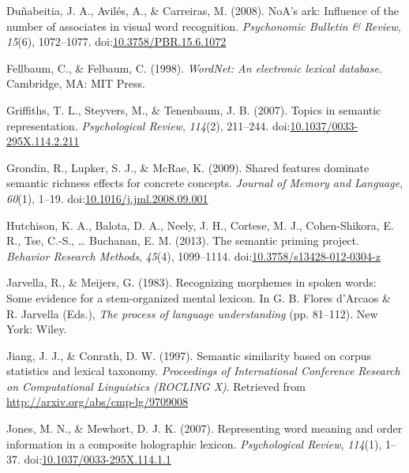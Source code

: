 \documentclass[english,,man]{apa6}
\begin{document}
\leavevmode\hypertarget{ref-Dunabeitia2008}{}%
Duñabeitia, J. A., Avilés, A., \& Carreiras, M. (2008). NoA's ark: Influence of the number of associates in visual word recognition. \emph{Psychonomic Bulletin \& Review}, \emph{15}(6), 1072--1077. doi:\href{https://doi.org/10.3758/PBR.15.6.1072}{10.3758/PBR.15.6.1072}

\leavevmode\hypertarget{ref-Felbaum1998}{}%
Fellbaum, C., \& Felbaum, C. (1998). \emph{WordNet: An electronic lexical database}. Cambridge, MA: MIT Press.

\leavevmode\hypertarget{ref-Griffiths2007}{}%
Griffiths, T. L., Steyvers, M., \& Tenenbaum, J. B. (2007). Topics in semantic representation. \emph{Psychological Review}, \emph{114}(2), 211--244. doi:\href{https://doi.org/10.1037/0033-295X.114.2.211}{10.1037/0033-295X.114.2.211}

\leavevmode\hypertarget{ref-Grondin2009}{}%
Grondin, R., Lupker, S. J., \& McRae, K. (2009). Shared features dominate semantic richness effects for concrete concepts. \emph{Journal of Memory and Language}, \emph{60}(1), 1--19. doi:\href{https://doi.org/10.1016/j.jml.2008.09.001}{10.1016/j.jml.2008.09.001}

\leavevmode\hypertarget{ref-Hutchison2013}{}%
Hutchison, K. A., Balota, D. A., Neely, J. H., Cortese, M. J., Cohen-Shikora, E. R., Tse, C.-S., \ldots{} Buchanan, E. M. (2013). The semantic priming project. \emph{Behavior Research Methods}, \emph{45}(4), 1099--1114. doi:\href{https://doi.org/10.3758/s13428-012-0304-z}{10.3758/s13428-012-0304-z}

\leavevmode\hypertarget{ref-Jarvella1983}{}%
Jarvella, R., \& Meijers, G. (1983). Recognizing morphemes in spoken words: Some evidence for a stem-organized mental lexicon. In G. B. Flores d'Arcaos \& R. Jarvella (Eds.), \emph{The process of language understanding} (pp. 81--112). New York: Wiley.

\leavevmode\hypertarget{ref-Jiang1997}{}%
Jiang, J. J., \& Conrath, D. W. (1997). Semantic similarity based on corpus statistics and lexical taxonomy. \emph{Proceedings of International Conference Research on Computational Linguistics (ROCLING X)}. Retrieved from \url{http://arxiv.org/abs/cmp-lg/9709008}

\leavevmode\hypertarget{ref-Jones2007}{}%
Jones, M. N., \& Mewhort, D. J. K. (2007). Representing word meaning and order information in a composite holographic lexicon. \emph{Psychological Review}, \emph{114}(1), 1--37. doi:\href{https://doi.org/10.1037/0033-295X.114.1.1}{10.1037/0033-295X.114.1.1}
\end{document}
